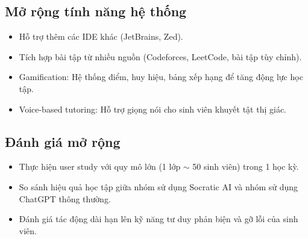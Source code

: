 \subsection{Mở rộng tính năng hệ thống}

\begin{itemize}
    \item Hỗ trợ thêm các IDE khác (JetBrains, Zed).
    \item Tích hợp bài tập từ nhiều nguồn (Codeforces, LeetCode, bài tập tùy chỉnh).
    \item Gamification: Hệ thống điểm, huy hiệu, bảng xếp hạng để tăng động lực học tập.
    \item Voice-based tutoring: Hỗ trợ giọng nói cho sinh viên khuyết tật thị giác.
\end{itemize}

\subsection{Đánh giá mở rộng}

\begin{itemize}
    \item Thực hiện user study với quy mô lớn (1 lớp $\sim$ 50 sinh viên) trong 1 học kỳ.
    \item So sánh hiệu quả học tập giữa nhóm sử dụng Socratic AI và nhóm sử dụng ChatGPT thông thường.
    \item Đánh giá tác động dài hạn lên kỹ năng tư duy phản biện và gỡ lỗi của sinh viên.
\end{itemize}

